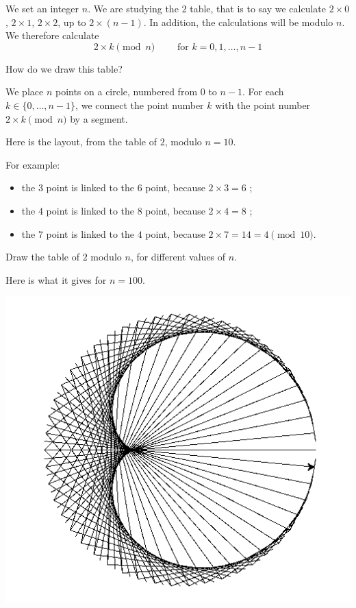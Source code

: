 \documentclass[11pt,class=report,crop=false]{standalone}
\begin{document}
\begin{activite}



We set an integer $n$. We are studying the $2$ table, that is to say 
we calculate $2 \times 0$, $2\times 1$, $2 \times 2$, up to $2 \times (n-1)$. In addition, the calculations will be modulo $n$. We therefore calculate  
$$2 \times k \pmod{n} \qquad \text{ for } k=0,1,\ldots,n-1$$

How do we draw this table?

We place $n$ points on a circle, numbered from $0$ to $n-1$.
For each $k\in \{0,\ldots,n-1\}$, we connect the point number $k$
with the point number $2\times k \pmod{n}$ by a segment. 

Here is the layout, from the table of $2$, modulo $n=10$.



For example:
\begin{itemize}
  \item the $3$ point is linked to the $6$ point, because $2 \times 3 = 6$ ;
  \item the $4$ point is linked to the $8$ point, because $2 \times 4 = 8$ ;
  \item the $7$ point is linked to the $4$ point, because $2 \times 7 = 14 = 4 \pmod{10}$.
\end{itemize}

\bigskip

Draw the table of $2$ modulo $n$, for different values of $n$.

Here is what it gives for $n=100$.

\begin{center}
\includegraphics[scale=\myscale,scale=0.5]{screen-turtle-5b}
\end{center}


\end{activite}
\end{document}
